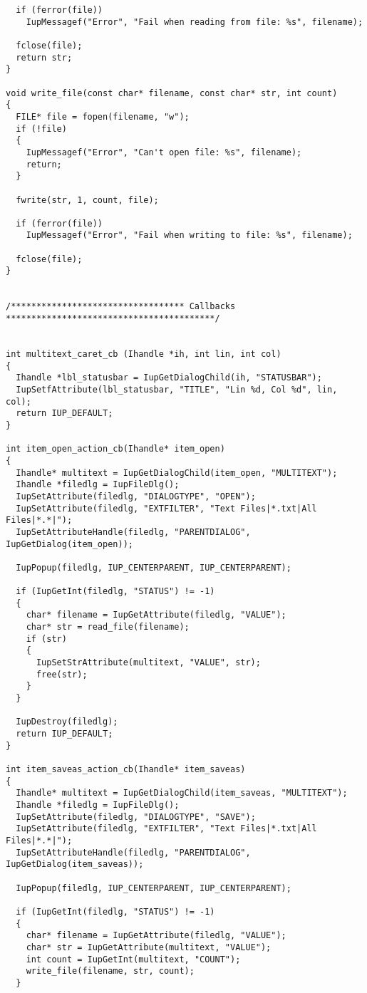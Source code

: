 \documentclass{ctexart}
\begin{document}
\begin{lstlisting}
  if (ferror(file))
    IupMessagef("Error", "Fail when reading from file: %s", filename);

  fclose(file);
  return str;
}

void write_file(const char* filename, const char* str, int count)
{
  FILE* file = fopen(filename, "w");
  if (!file)
  {
    IupMessagef("Error", "Can't open file: %s", filename);
    return;
  }

  fwrite(str, 1, count, file);

  if (ferror(file))
    IupMessagef("Error", "Fail when writing to file: %s", filename);

  fclose(file);
}


/********************************** Callbacks *****************************************/


int multitext_caret_cb (Ihandle *ih, int lin, int col)
{
  Ihandle *lbl_statusbar = IupGetDialogChild(ih, "STATUSBAR");
  IupSetfAttribute(lbl_statusbar, "TITLE", "Lin %d, Col %d", lin, col);
  return IUP_DEFAULT;
}

int item_open_action_cb(Ihandle* item_open)
{
  Ihandle* multitext = IupGetDialogChild(item_open, "MULTITEXT");
  Ihandle *filedlg = IupFileDlg();
  IupSetAttribute(filedlg, "DIALOGTYPE", "OPEN");
  IupSetAttribute(filedlg, "EXTFILTER", "Text Files|*.txt|All Files|*.*|");
  IupSetAttributeHandle(filedlg, "PARENTDIALOG", IupGetDialog(item_open));

  IupPopup(filedlg, IUP_CENTERPARENT, IUP_CENTERPARENT);

  if (IupGetInt(filedlg, "STATUS") != -1)
  {
    char* filename = IupGetAttribute(filedlg, "VALUE");
    char* str = read_file(filename);
    if (str)
    {
      IupSetStrAttribute(multitext, "VALUE", str);
      free(str);
    }
  }

  IupDestroy(filedlg);
  return IUP_DEFAULT;
}

int item_saveas_action_cb(Ihandle* item_saveas)
{
  Ihandle* multitext = IupGetDialogChild(item_saveas, "MULTITEXT");
  Ihandle *filedlg = IupFileDlg();
  IupSetAttribute(filedlg, "DIALOGTYPE", "SAVE");
  IupSetAttribute(filedlg, "EXTFILTER", "Text Files|*.txt|All Files|*.*|");
  IupSetAttributeHandle(filedlg, "PARENTDIALOG", IupGetDialog(item_saveas));

  IupPopup(filedlg, IUP_CENTERPARENT, IUP_CENTERPARENT);

  if (IupGetInt(filedlg, "STATUS") != -1)
  {
    char* filename = IupGetAttribute(filedlg, "VALUE");
    char* str = IupGetAttribute(multitext, "VALUE");
    int count = IupGetInt(multitext, "COUNT");
    write_file(filename, str, count);
  }


\end{lstlisting}
\end{document}
